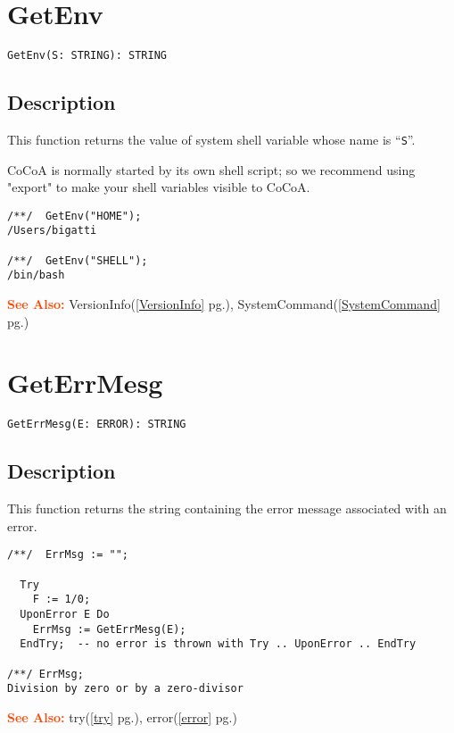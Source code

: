 \documentclass[a4paper]{mybook}
\newenvironment{command}{}{} %
\newcommand\SeeAlso{\par\textcolor{OrangeRed}{\textbf{\large See Also: }}}
\begin{document}
\section{GetEnv}
\label{GetEnv}
\begin{command} %


\begin{Verbatim}[label=syntax, rulecolor=\color{MidnightBlue},
frame=single]
GetEnv(S: STRING): STRING
\end{Verbatim}


\subsection*{Description}

This function returns the value of system shell variable whose name
is ``\verb&S&''.
\par 
CoCoA is normally started by its own shell script; so we recommend
using "export" to make your shell variables visible to CoCoA.
\begin{Verbatim}[label=example, rulecolor=\color{PineGreen}, frame=single]
/**/  GetEnv("HOME");
/Users/bigatti

/**/  GetEnv("SHELL");
/bin/bash
\end{Verbatim}


\SeeAlso %
  VersionInfo(\ref{VersionInfo} pg.\pageref{VersionInfo}), 
    SystemCommand(\ref{SystemCommand} pg.\pageref{SystemCommand})
\end{command} %

\section{GetErrMesg}
\label{GetErrMesg}
\begin{command} %


\begin{Verbatim}[label=syntax, rulecolor=\color{MidnightBlue},
frame=single]
GetErrMesg(E: ERROR): STRING
\end{Verbatim}


\subsection*{Description}

This function returns the string containing the error message
associated with an error.
\begin{Verbatim}[label=example, rulecolor=\color{PineGreen}, frame=single]
/**/  ErrMsg := "";

  Try
    F := 1/0;
  UponError E Do
    ErrMsg := GetErrMesg(E);
  EndTry;  -- no error is thrown with Try .. UponError .. EndTry

/**/ ErrMsg;
Division by zero or by a zero-divisor
\end{Verbatim}


\SeeAlso %
  try(\ref{try} pg.\pageref{try}), 
    error(\ref{error} pg.\pageref{error})
\end{command} %
\end{document}
